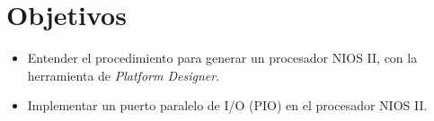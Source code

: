 \section{Objetivos \label{sec:obj}}


\begin{itemize} 
	\item Entender el procedimiento para generar un procesador NIOS II, con la herramienta de \textit{Platform Designer}.
	\item Implementar un puerto paralelo de I/O (PIO) en el procesador NIOS II.
\end{itemize}